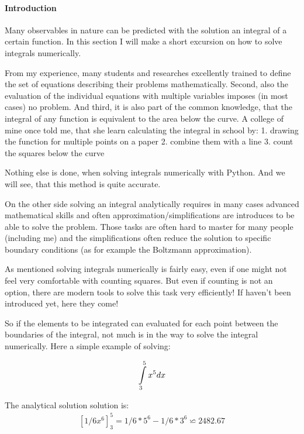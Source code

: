 \documentclass[11pt]{article}
\begin{document}
\hypertarget{introduction}{%
\paragraph{Introduction}\label{introduction}}

Many observables in nature can be predicted with the solution an
integral of a certain function. In this section I will make a short
excursion on how to solve integrals numerically.

From my experience, many students and researches excellently trained to
define the set of equations describing their problems mathematically.
Second, also the evaluation of the individual equations with multiple
variables imposes (in most cases) no problem. And third, it is also part
of the common knowledge, that the integral of any function is equivalent
to the area below the curve. A college of mine once told me, that she
learn calculating the integral in school by: 1. drawing the function for
multiple points on a paper 2. combine them with a line 3. count the
squares below the curve

Nothing else is done, when solving integrals numerically with Python.
And we will see, that this method is quite accurate.

On the other side solving an integral analytically requires in many
cases advanced mathematical skills and often
approximation/simplifications are introduces to be able to solve the
problem. Those tasks are often hard to master for many people (including
me) and the simplifications often reduce the solution to specific
boundary conditions (as for example the Boltzmann approximation).

As mentioned solving integrals numerically is fairly easy, even if one
might not feel very comfortable with counting squares. But even if
counting is not an option, there are modern tools to solve this task
very efficiently! If haven't been introduced yet, here they come!

So if the elements to be integrated can evaluated for each point between
the boundaries of the integral, not much is in the way to solve the
integral numerically. Here a simple example of solving:

\begin{align}
\intop_{3}^{5}x{{}^5}dx
\end{align}

The analytical solution solution is: \begin{align}
\left[1/6x^6\right]_{3}^{5}=1/6*5^6-1/6*3^6\backsimeq2482.67
\end{align}
\end{document}
